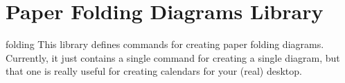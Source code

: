 %
%
%


\section{Paper Folding Diagrams Library}

\label{section-calender-folding}

\begin{tikzlibrary}{folding}
  This library defines commands for creating paper folding
  diagrams. Currently, it just contains a single command for creating
  a single diagram, but that one is really useful for creating
  calendars for your (real) desktop.
\end{tikzlibrary}

